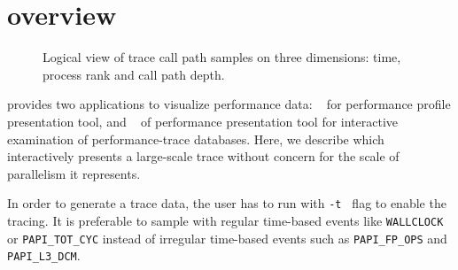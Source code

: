 


\newcommand{\crosshair}{crosshair}
\newcommand{\traceview}{Trace view}
\newcommand{\depthview}{Depth view}
\newcommand{\miniview}{Mini map view}
\newcommand{\callview}{Call path view}



\section{\hpctraceviewer{} overview}

\begin{figure}[t]
\caption{Logical view of trace call path samples on three dimensions: time, process rank and call path depth.}
\label{fig:hpctraceviewer-callpath}
\end{figure}

\HPCToolkit{} provides two applications to visualize performance data: \hpcviewer{}~\cite{Adhianto-MC-Ta:2010:PSTI-hpcviewer} for performance profile presentation tool, and \hpctraceviewer{}~\cite{Tallent-MC-etal:2011:hpctoolkit-scalable-tracing} of performance presentation tool for interactive examination of performance-trace databases.
Here, we describe \hpctraceviewer{} which interactively presents a large-scale trace without concern for the scale of parallelism it represents.

In order to generate a trace data, the user has to run \hpcrun{} with {\tt -t } flag to enable the tracing. It is preferable to sample with regular time-based events like {\tt WALLCLOCK} or {\tt PAPI\_TOT\_CYC} instead of irregular time-based events such as {\tt PAPI\_FP\_OPS} and {\tt PAPI\_L3\_DCM}.


